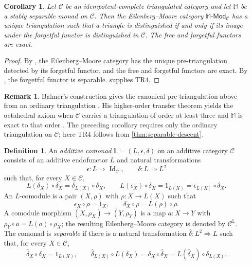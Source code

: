 \documentclass[a4paper,11pt,reqno]{amsart}
\newtheorem{corollary}[corollary]{Corollary}
\theoremstyle{definition}
\newtheorem{definition}[definition]{Definition}
\newtheorem{remark}[remark]{Remark}
\theoremstyle{plain}
\numberwithin{equation}{section}
\newcommand{\C}{\mathcal C}
\begin{document}
\begin{corollary}
\label{cor:separable-monad}
Let $\C$ be an idempotent-complete triangulated category and let
$\mathbb M$ be a stably separable monad on $\C$.  Then the
Eilenberg--Moore category $\mathbb M\text{-}\mathsf{Mod}_\C$ has a unique
triangulation such that a triangle is distinguished if and only if its
image under the forgetful functor is distinguished in $\C$.  The free and
forgetful functors are exact.
\end{corollary}

\begin{proof}
By \cite[Theorem~4.1 and Corollary~4.3]{Balmer2011}, the
Eilenberg--Moore category has the unique pre-triangulation detected by its
forgetful functor, and the free and forgetful functors are exact.  By
\cite[Proposition~3.11]{Balmer2011}, the forgetful functor is separable.
 supplies \(\mathrm{TR4}\).
\end{proof}

\begin{remark}
Balmer's construction gives the canonical pre-triangulation above from an
ordinary triangulation
\cite[Theorem~4.1 and Corollary~4.3]{Balmer2011}.  His higher-order
transfer theorem yields the octahedral axiom when \(\C\) carries a
triangulation of order at least three and \(\mathbb M\) is exact to that
order \cite[Theorem~5.17]{Balmer2011}.  The preceding corollary requires
only the ordinary triangulation on \(\C\); here \(\mathrm{TR4}\) follows
from \cref{thm:separable-descent}.
\end{remark}

\begin{definition}
An \emph{additive comonad} \(\mathbb L=(L,\epsilon,\delta)\) on an
additive category \(\C\) consists of an additive endofunctor \(L\) and
natural transformations
\[
 \epsilon:L\Rightarrow\operatorname{Id}_\C,
 \qquad
 \delta:L\Rightarrow L^2
\]
such that, for every \(X\in\C\),
\[
 L(\delta_X)\circ\delta_X=\delta_{L(X)}\circ\delta_X,\qquad
 L(\epsilon_X)\circ\delta_X=1_{L(X)}
 =\epsilon_{L(X)}\circ\delta_X.
\]
An \(L\)-comodule is a pair \((X,\rho)\) with \(\rho:X\to L(X)\) such
that
\[
 \epsilon_X\circ\rho=1_X,
 \qquad
 \delta_X\circ\rho=L(\rho)\circ\rho.
\]
A comodule morphism \((X,\rho_X)\to(Y,\rho_Y)\) is a map \(a:X\to Y\)
with \(\rho_Y\circ a=L(a)\circ\rho_X\); the resulting Eilenberg--Moore
category is denoted by \(\C^{\mathbb L}\).  The comonad is
\emph{separable} if there is a natural transformation
\(\widehat\delta:L^2\Rightarrow L\) such that, for every \(X\in\C\),
\begin{equation}
\label{eq:separable-comonad-identities}
 \widehat\delta_X\circ\delta_X=1_{L(X)},\qquad
 \widehat\delta_{L(X)}\circ L(\delta_X)
 =\delta_X\circ\widehat\delta_X
 =L(\widehat\delta_X)\circ\delta_{L(X)}.
\end{equation}
\end{definition}
\end{document}

